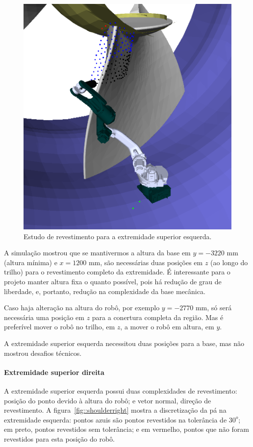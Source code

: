 \begin{figure}[!ht]
	\centering	
	\includegraphics[width=.5\columnwidth]{figs/shoulderleft.png}
	\caption{Estudo de revestimento para a extremidade superior esquerda.}
	\label{fig::shoulderleft}
\end{figure}

A simulação mostrou que se mantivermos a altura da base em $y=-3220$ mm
(altura mínima) e $x=1200$ mm, são necessárias duas posições em $z$ (ao longo do
trilho) para o revestimento completo da extremidade. É interessante para o
projeto manter altura fixa o quanto possível, pois há redução de grau de
liberdade, e, portanto, redução na complexidade da base mecânica.

Caso haja alteração na altura do robô, por exemplo  $y=-2770$ mm, só será
necessária uma posição em $z$ para a conertura completa da região. Mas é
preferível mover o robô no trilho, em $z$, a mover o robô em altura, em $y$. 

A extremidade superior esquerda necessitou duas posições para a base, mas não
mostrou desafios técnicos.

\paragraph{Extremidade superior direita}

A extremidade superior esquerda possui duas complexidades de revestimento:
posição do ponto devido à altura do robô; e vetor normal, direção de
revestimento. A figura~\ref{fig::shoulderright} mostra a discretização da pá na
extremidade esquerda: pontos azuis são pontos revestidos na tolerância de $30^o$; em preto, pontos revestidos sem tolerância; e em vermelho, pontos que
não foram revestidos para esta posição do robô.

